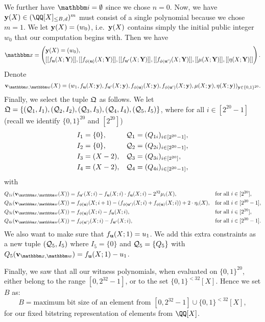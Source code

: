 \documentclass[11pt,letterpaper,usenames,dvipsnames]{article}
\begin{document}
We further have $\idx = \emptyset$ since we chose $n=0$. Now, we have $\yy(X) \in \mainQpolyring^m$ must consist of a single polynomial because we chose $m=1$. We let $\mathbf{y}(X) = (w_0)$, i.e.\ $\mathbf{y}(X)$ contains simply the initial public integer $w_0$ that our computation begins with. Then we have $$\inp = \left(\begin{aligned}&\yy(X)=(w_0),\\ &\oracle{f_{\uu}(X;\YY)}, \oracle{f_{\phi(\uu)}(X;\YY)}, \oracle{f_{\uu'}(X;\YY)}, \oracle{f_{\phi(\uu')}(X;\YY)}, \oracle{\mu(X;\YY)}, \oracle{\eta(X;\YY)}\end{aligned}\right).$$
%
Denote
%
$$
\vv_{\inp,\wit}(X)=(w_1, f_{\uu}(X;\yy), f_{\uu'}(X;\yy), f_{\phi(\uu)}(X;\yy), f_{\phi(\uu')}(X;\yy), \mu(X;\yy), \eta(X;\yy))_{\yy\in \{0,1\}^{20}}.
$$
Finally, we select the tuple $\mathfrak{Q}$ as follows. We let $\mathfrak{Q}=\{(\mathcal{Q}_1, I_1), (\mathcal{Q}_2, I_2), (\mathcal{Q}_3, I_3), (\mathcal{Q}_4, I_4), (\mathcal{Q}_5, I_5)\}$,
where for all $i\in [2^{20}-1]$ (recall we identify $\{0,1\}^{20}$ and $[2^{20}]$)
%
\begin{align*}
    &I_1 = \{0\}, &&\mathcal{Q}_1=(Q_{1i})_{i\in [2^{20}-1]},\\
    &I_2 = \{0\}, &&\mathcal{Q}_2=(Q_{2i})_{i\in [2^{20}-1]},\\
    &I_3 =(X-2), &&\mathcal{Q}_3=(Q_{3i})_{i\in [2^{20}]},\\
      &I_4 =(X-2), &&\mathcal{Q}_4=(Q_{4i})_{i\in [2^{20}-1]},
\end{align*}
with
\begin{align*}
    Q_{1i}(\vv_{\inp,\wit}(X))&=f_{\uu'}(X; i) - f_{\uu}(X;i)\cdot f_{\uu}(X;i) - 2^{32} \mu_i(X),&& \text{for all } i\in [2^{20}],\\
    Q_{2i}(\vv_{\inp,\wit}(X))&=f_{\phi(\uu)}(X; i+1) - (f_{\phi(\uu')}(X;i) + f_{\phi(\uu)}(X;i)) + 2\cdot \eta_i(X),&& \text{for all } i\in [2^{20}-1],\\
    Q_{3i}(\vv_{\inp,\wit}(X))&=f_{\phi(\uu)}(X;i)-f_{\uu}(X;i), && \text{for all } i\in [2^{20}],\\
    Q_{4i}(\vv_{\inp,\wit}(X))&=f_{\phi(\uu')}(X;i)-f_{\uu'}(X;i), && \text{for all } i\in [2^{20}-1].
\end{align*}
We also want to make sure that $f_{\mathbf{u}}(X; 1)= u_1$. We add this extra constraints as a new tuple  $(\mathcal{Q}_5, I_5)$ where $I_5=\{0\}$ and $\mathcal{Q}_5=\{Q_5\}$ with $Q_5(\vv_{\inp,\wit})= f_{\uu}(X;1)-u_1$.

Finally, we saw that all our witness polynomials, when evaluated on $\{0,1\}^{20}$, either belong to the range $[0, 2^{32}-1]$, or to the set $\{0,1\}^{< 32}[X]$. Hence we set $B$ as:
%
$$
B=\text{maximum bit size of an element from } [0,2^{32}-1] \cup \{0,1\}^{< 32}[X],
$$
for our fixed bitstring representation of elements from $\QQ[X]$.
\end{document}
